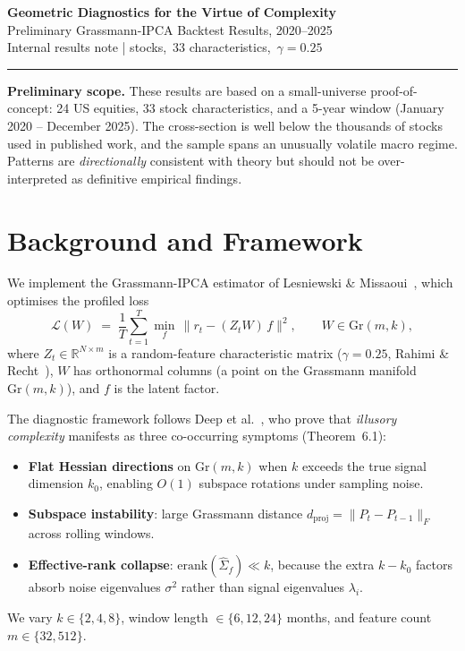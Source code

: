 \documentclass[11pt, a4paper]{article}
\begin{document}
\begin{center}
  {\LARGE\bfseries
    Geometric Diagnostics for the Virtue of Complexity}\\[6pt]
  {\large
    Preliminary Grassmann-IPCA Backtest Results, 2020--2025}\\[10pt]
  {\small
    Internal results note \quad| stocks,\ 33 characteristics,\ $\gamma = 0.25$}
\end{center}

\vspace{4pt}
\noindent\rule{\linewidth}{1pt}
\vspace{2pt}

\begin{notebox}
\textbf{Preliminary scope.}\;
These results are based on a small-universe proof-of-concept: 24 US equities, 33 stock characteristics, and a 5-year window (January 2020 -- December 2025). The cross-section is well below the thousands of stocks used in published work, and the sample spans an unusually volatile macro regime. Patterns are \emph{directionally} consistent with theory but should not be over-interpreted as definitive empirical findings.
\end{notebox}

\section{Background and Framework}

We implement the Grassmann-IPCA estimator of Lesniewski \& Missaoui~\cite{LM2026}, which optimises the profiled loss
\[
  \mathcal{L}(W) \;=\; \frac{1}{T}\sum_{t=1}^{T}
    \min_{f}\,\bigl\|r_t - (Z_t W)\,f\bigr\|^2,
    \qquad W \in \mathrm{Gr}(m, k),
\]
where $Z_t \in \mathbb{R}^{N\times m}$ is a random-feature characteristic matrix ($\gamma=0.25$, Rahimi \& Recht~\cite{RR2007}), $W$ has orthonormal columns (a point on the Grassmann manifold $\mathrm{Gr}(m,k)$), and $f$ is the latent factor.

The diagnostic framework follows Deep et al.~\cite{DLMP2026}, who prove that \emph{illusory complexity} manifests as three co-occurring symptoms (Theorem~6.1):
\begin{itemize}[leftmargin=1.4em, itemsep=2pt]
  \item \textbf{Flat Hessian directions} on $\mathrm{Gr}(m,k)$ when $k$ exceeds the true signal dimension $k_0$, enabling $O(1)$ subspace rotations under sampling noise.
  \item \textbf{Subspace instability}: large Grassmann distance $d_{\mathrm{proj}} = \|P_t - P_{t-1}\|_F$ across rolling windows.
  \item \textbf{Effective-rank collapse}: $\mathrm{erank}(\hat{\Sigma}_f) \ll k$, because the extra $k - k_0$ factors absorb noise eigenvalues $\sigma^2$ rather than signal eigenvalues $\lambda_i$.
\end{itemize}
We vary $k \in \{2, 4, 8\}$, window length $\in \{6, 12, 24\}$ months, and feature count $m \in \{32, 512\}$.
\end{document}
